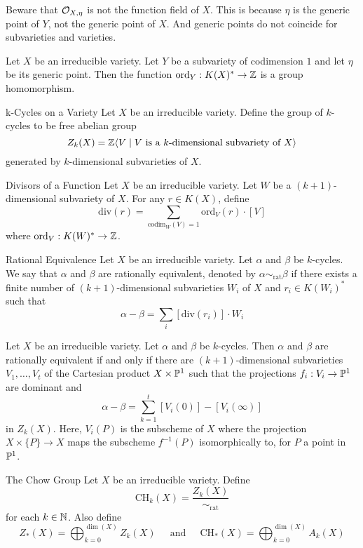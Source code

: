 \documentclass[a4paper]{article}
\begin{document}
Beware that $\mathcal{O}_{X,\eta}$ is not the function field of $X$. This is because $\eta$ is the generic point of $Y$, not the generic point of $X$. And generic points do not coincide for subvarieties and varieties. 

\begin{lmm}{}{} Let $X$ be an irreducible variety. Let $Y$ be a subvariety of codimension $1$ and let $\eta$ be its generic point. Then the function $\text{ord}_Y:K(X)^\ast\to\mathbb{Z}$ is a group homomorphism. 
\end{lmm}

\begin{defn}{k-Cycles on a Variety}{} Let $X$ be an irreducible variety. Define the group of $k$-cycles to be free abelian group $$Z_k(X)=\mathbb{Z}\langle V\;|\;V\text{ is a }k\text{-dimensional subvariety of }X\rangle$$ generated by $k$-dimensional subvarieties of $X$. 
\end{defn}

\begin{defn}{Divisors of a Function}{} Let $X$ be an irreducible variety. Let $W$ be a $(k+1)$-dimensional subvariety of $X$. For any $r\in K(X)$, define $$\text{div}(r)=\sum_{\text{codim}_W(V)=1}\text{ord}_V(r)\cdot[V]$$ where $\text{ord}_V:K(W)^\ast\to\mathbb{Z}$. 
\end{defn}

\begin{defn}{Rational Equivalence}{} Let $X$ be an irreducible variety. Let $\alpha$ and $\beta$ be $k$-cycles. We say that $\alpha$ and $\beta$ are rationally equivalent, denoted by $\alpha\sim_{\text{rat}}\beta$ if there exists a finite number of $(k+1)$-dimensional subvarieties $W_i$ of $X$ and $r_i\in K(W_i)^\ast$ such that $$\alpha-\beta=\sum_i[\text{div}(r_i)]\cdot W_i$$
\end{defn}

\begin{thm}{}{} Let $X$ be an irreducible variety. Let $\alpha$ and $\beta$ be $k$-cycles. Then $\alpha$ and $\beta$ are rationally equivalent if and only if there are $(k+1)$-dimensional subvarieties $V_1,\dots,V_t$ of the Cartesian product $X\times\mathbb{P}^1$ such that the projections $f_i:V_i\to\mathbb{P}^1$ are dominant and $$\alpha-\beta=\sum_{k=1}^t[V_i(0)]-[V_i(\infty)]$$ in $Z_k(X)$. Here, $V_i(P)$ is the subscheme of $X$ where the projection $X\times\{P\}\to X$ maps the subscheme $f^{-1}(P)$ isomorphically to, for $P$ a point in $\mathbb{P}^1$. 
\end{thm}

\begin{defn}{The Chow Group}{} Let $X$ be an irreducible variety. Define $$\text{CH}_k(X)=\frac{Z_k(X)}{\sim_\text{rat}}$$ for each $k\in\mathbb{N}$. Also define $$Z_\ast(X)=\bigoplus_{k=0}^{\dim(X)}Z_k(X)\;\;\;\;\text{ and }\;\;\;\;\text{CH}_\ast(X)=\bigoplus_{k=0}^{\dim(X)}A_k(X)$$
\end{defn}
\end{document}
